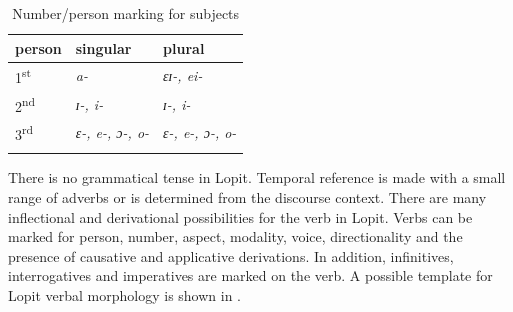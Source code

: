 \documentclass[output=paper,colorlinks,citecolor=brown,draftmode]{langscibook}
\begin{document}
\begin{table}
    \begin{tabularx}{0.5\textwidth}{lXX}
    \lsptoprule
    { person} & { singular} & { plural} \\
    \midrule
    {1\textsuperscript{st}} & \textit{a-} & \textit{ɛɪ-, ei-} \\
    {2\textsuperscript{nd}} & \textit{ɪ-, i-} & \textit{ɪ-, i-} \\
    {3\textsuperscript{rd}} & \textit{ɛ-, e-, ɔ-, o-} & \textit{ɛ-, e-, ɔ-, o-} \\ 
    \lspbottomrule 
    \end{tabularx}
    \caption{Number/person marking for subjects}
    \label{tab:lop:1}
\end{table}

There is no grammatical tense in Lopit. Temporal reference is made with a small range of adverbs or is determined from the discourse context. There are many inflectional and derivational possibilities for the verb in Lopit. Verbs can be marked for person, number, aspect, modality, voice, directionality and the presence of causative and applicative derivations. In addition, infinitives, interrogatives and imperatives are marked on the verb. A possible template for Lopit verbal morphology is shown in .
\end{document}
